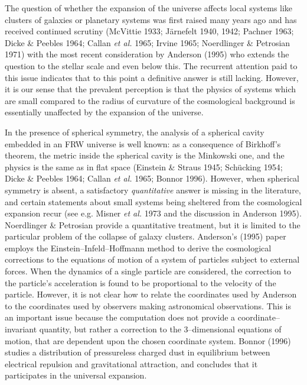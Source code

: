   
       The question of whether the expansion of the universe affects local
  systems like clusters of galaxies or planetary systems was first raised
  many years ago and has received continued scrutiny (McVittie 1933; 
  J\"{a}rnefelt
  1940, 1942; Pachner 1963; Dicke \& Peebles 1964; Callan {\em et al.} 1965; 
  Irvine 1965; Noerdlinger
  \& Petrosian 1971) with the most recent consideration by Anderson (1995) 
  who extends the question to the stellar scale and even below this. The 
  recurrent
  attention paid to this issue indicates that to this point a definitive answer
  is still lacking. However, it is our sense that the prevalent perception 
  is that the physics of systems which are small compared to the radius of
  curvature of the cosmological background is essentially unaffected by the
  expansion of the universe.
  
  In the presence of spherical symmetry, the 
  analysis of a spherical cavity embedded in an
  FRW universe is well known: as a consequence of
  Birkhoff's theorem, the metric inside the spherical cavity is the Minkowski
  one, and the physics is the same as in flat space (Einstein \& Straus 1945;
  Sch\"{u}cking 1954; Dicke \& Peebles 1964;
  Callan {\em et al.} 1965; Bonnor 1996). However, when spherical 
  symmetry is absent, a
  satisfactory {\em quantitative} answer is missing in the literature, and
  certain statements about small systems being sheltered from the cosmological
  expansion recur (see e.g. Misner {\em et al.} 1973
  and the discussion in Anderson 1995). Noerdlinger \& Petrosian
  provide a quantitative treatment, but it is limited to the particular problem 
  of the collapse of galaxy clusters. Anderson's (1995) paper employs the
  Einstein--Infeld--Hoffmann method to derive the cosmological corrections to 
  the
  equations of motion of a system of particles subject to external forces. 
  When the dynamics of a single particle are considered, the 
  correction to the particle's acceleration is found to be proportional to 
  the velocity of the particle.
  However, it is 
  not clear how to relate the coordinates used by  Anderson
to the coordinates used by observers making astronomical observations.
  This is an important 
  issue because the computation 
  does not provide a coordinate--invariant
  quantity, but rather a correction to the 3--dimensional
  equations of motion, that are dependent upon the chosen coordinate
  system.
  Bonnor (1996) studies a distribution of pressureless charged dust in
  equilibrium between electrical repulsion and gravitational attraction, and
  concludes that it participates in the universal expansion.
                    

